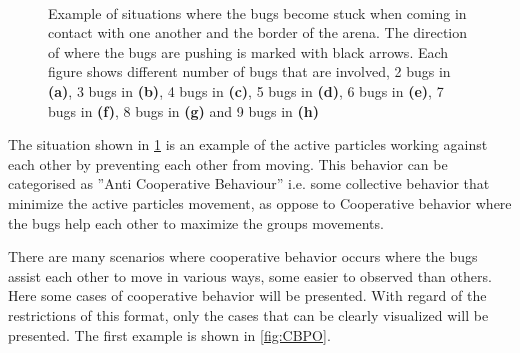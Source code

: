\begin{figure}[htpb!]
\centering
 \quad
{} \quad
{} \quad
{}\\
 \quad
{} \quad
{} \quad
{}

\caption{Example of situations where the bugs become stuck when coming in contact with 
one another and the border of the arena. The direction of where the bugs are pushing is marked with black arrows. 
Each figure shows different number of bugs that are involved, 2 bugs in \textbf{(a)}, 3 bugs in \textbf{(b)}, 
4 bugs in \textbf{(c)}, 5 bugs in \textbf{(d)}, 6 bugs in \textbf{(e)}, 7 bugs in \textbf{(f)}, 
8 bugs in \textbf{(g)} and 9 bugs in \textbf{(h)}} 
\label{fig:BB}
\end{figure}

The situation shown in \cref{fig:BB} is an example of the active particles working against each other by preventing 
each other from moving. This behavior can be categorised as ''Anti Cooperative Behaviour'' i.e. some collective 
behavior that minimize the active particles movement, as oppose to Cooperative behavior where the bugs 
help each other to maximize the groups movements.

There are many scenarios where cooperative behavior occurs where the bugs assist each other to move in 
various ways, some easier to observed than others. Here some cases of cooperative behavior will be presented. 
With regard of the restrictions of this format, only the cases that can be clearly visualized will be presented. 
The first example is shown in \cref{fig:CBPO}. 

